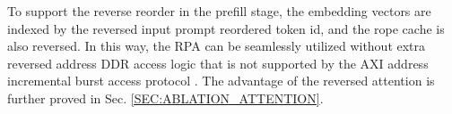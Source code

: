 \documentclass[sigconf]{acmart}
\begin{document}
To support the reverse reorder in the prefill stage, the embedding vectors are indexed by the reversed input prompt reordered token id, and the rope cache is also reversed. In this way, the RPA can be seamlessly utilized without extra reversed address DDR access logic that is not supported by the AXI address incremental burst access protocol \cite{amd_ug1037}. The advantage of the reversed attention is further proved in Sec. \ref{SEC:ABLATION_ATTENTION}.
\end{document}
